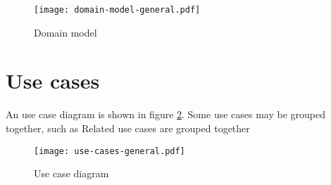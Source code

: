 \begin{figure}
    \centering
    \texttt{[image: domain-model-general.pdf]}
    \caption{Domain model}
    \label{fig:domain1}
\end{figure}

\section{Use cases}

An use case diagram is shown in figure \ref{fig:usecases1}. Some use cases may be grouped together, such as Related use cases are grouped together


\begin{figure}
    \centering
    \texttt{[image: use-cases-general.pdf]}
    \caption{Use case diagram}
    \label{fig:usecases1}
\end{figure}

